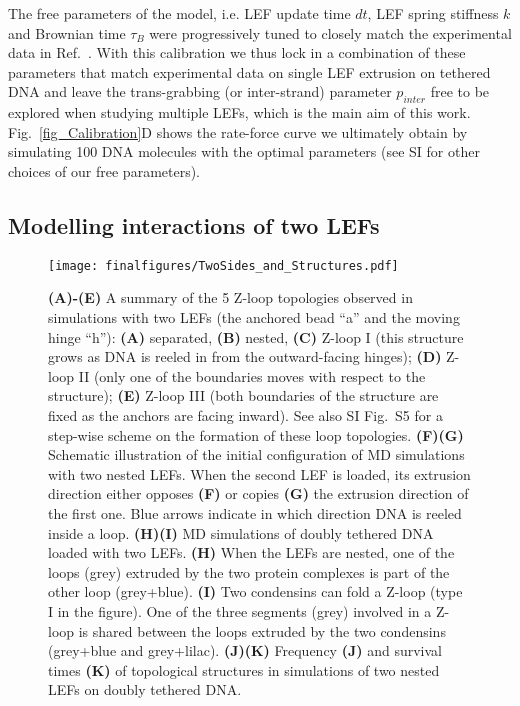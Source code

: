\documentclass[aps,prl,twocolumn,a4paper,10pt,notitlepage,footinbib,nobalancelastpage,superscriptaddress,showpacs,floatfix]{revtex4-1}%
\begin{document}
The free parameters of the model, i.e. LEF update time $dt$, LEF spring stiffness $k$ and Brownian time $\tau_B$ were progressively tuned to closely match the experimental data in Ref.~\cite{Ganji2018}. With this calibration we thus lock in a combination of these parameters that match experimental data on single LEF extrusion on tethered DNA and leave the trans-grabbing (or inter-strand) parameter $p_{inter}$ free to be explored when studying multiple LEFs, which is the main aim of this work. Fig.~\ref{fig_Calibration}D shows the rate-force curve we ultimately obtain by simulating 100 DNA molecules with the optimal parameters (see SI for other choices of our free parameters).

\subsection{Modelling interactions of two LEFs}

\begin{figure*}[t!]	
	\texttt{[image: finalfigures/TwoSides\_and\_Structures.pdf]}
	\caption{\textbf{(A)-(E)} A summary of the 5 Z-loop topologies observed in simulations with two LEFs (the anchored bead ``a'' and the moving hinge ``h''): \textbf{(A)} separated, \textbf{(B)} nested, \textbf{(C)} Z-loop I (this structure grows as DNA is reeled in from the outward-facing hinges); \textbf{(D)} Z-loop II (only one of the boundaries moves with respect to the structure); \textbf{(E)} Z-loop III (both boundaries of the structure are fixed as the anchors are facing inward). See also SI Fig.~S5 for a step-wise scheme on the formation of these loop topologies. \textbf{(F)(G)} Schematic illustration of the initial configuration of MD simulations with two nested LEFs. When the second LEF is loaded, its extrusion direction either opposes \textbf{(F)} or copies \textbf{(G)} the extrusion direction of the first one. Blue arrows indicate in which direction DNA is reeled inside a loop. \textbf{(H)(I)} MD simulations of doubly tethered DNA loaded with two LEFs. \textbf{(H)} When the LEFs are nested, one of the loops (grey) extruded by the two protein complexes is part of the other loop (grey+blue). \textbf{(I)} Two condensins can fold a Z-loop (type I in the figure). One of the three segments (grey) involved in a Z-loop is shared between the loops extruded by the two condensins (grey+blue and grey+lilac). \textbf{(J)(K)} Frequency \textbf{(J)} and survival times \textbf{(K)} of topological structures in simulations of two nested LEFs on doubly tethered DNA. }
	\label{fig_TwoSides_and_Structures}
\end{figure*}
\end{document}
